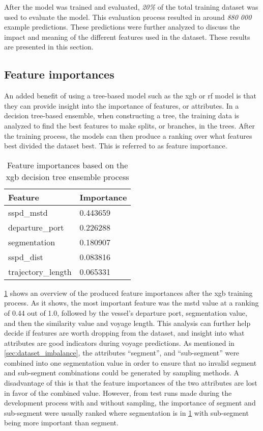 After the model was trained and evaluated, \textit{20\%} of the total training dataset was used to evaluate the model. This evaluation process resulted in around \textit{880 000} example predictions. These predictions were further analyzed to discuss the impact and meaning of the different features used in the dataset. These results are presented in this section.

\subsection{Feature importances}

An added benefit of using a tree-based model such as the \acrfull{xgb} or \acrfull{rf} model is that they can provide insight into the importance of features, or attributes. In a decision tree-based ensemble, when constructing a tree, the training data is analyzed to find the best features to make splits, or branches, in the trees. After the training process, the models can then produce a ranking over what features best divided the dataset best. This is referred to as feature importance.

\begin{table}[htbp]
    \centering
    \begin{tabularx}{0.6\textwidth}{X X}
        \bfseries{Feature} & \bfseries{Importance} \\ \toprule
        sspd\_mstd         & 0.443659 \\ \midrule
        departure\_port    & 0.226288 \\ \midrule
        segmentation       & 0.180907 \\ \midrule
        sspd\_dist         & 0.083816 \\ \midrule
        trajectory\_length & 0.065331 \\ \bottomrule
    \end{tabularx}
    \caption{Feature importances based on the \acrshort{xgb} decision tree ensemble process}\label{tab:feature_importances}
\end{table}

\cref{tab:feature_importances} shows an overview of the produced feature importances after the \acrshort{xgb} training process. As it shows, the most important feature was the \acrshort{mstd} value at a ranking of 0.44 out of 1.0, followed by the vessel's departure port, segmentation value, and then the similarity value and voyage length. This analysis can further help decide if features are worth dropping from the dataset, and insight into what attributes are good indicators during voyage predictions. As mentioned in \cref{sec:dataset_imbalance}, the attributes ``segment'', and ``sub-segment'' were combined into one segmentation value in order to ensure that no invalid segment and sub-segment combinations could be generated by sampling methods. A disadvantage of this is that the feature importances of the two attributes are lost in favor of the combined value. However, from test runs made during the development process with and without sampling, the importance of segment and sub-segment were usually ranked where segmentation is in \cref{tab:feature_importances} with sub-segment being more important than segment.

